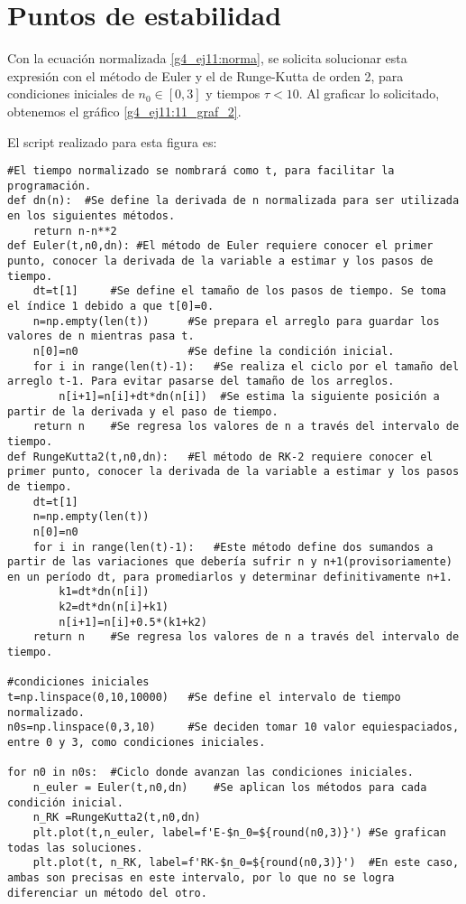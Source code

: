 \documentclass[../portafolio.tex]{subfiles}
\begin{document}
\section{Puntos de estabilidad}
Con la ecuación normalizada \eqref{g4_ej11:norma}, se solicita solucionar esta expresión con el método de Euler y el de Runge-Kutta de orden 2, para condiciones iniciales de $n_0 \in [0,3]$ y tiempos $\tau <10$. Al graficar lo solicitado, obtenemos el gráfico \ref{g4_ej11:11_graf_2}.

El script realizado para esta figura es:
\begin{verbatim}
#El tiempo normalizado se nombrará como t, para facilitar la programación.
def dn(n):  #Se define la derivada de n normalizada para ser utilizada en los siguientes métodos.
    return n-n**2
def Euler(t,n0,dn): #El método de Euler requiere conocer el primer punto, conocer la derivada de la variable a estimar y los pasos de tiempo.
    dt=t[1]     #Se define el tamaño de los pasos de tiempo. Se toma el índice 1 debido a que t[0]=0.
    n=np.empty(len(t))      #Se prepara el arreglo para guardar los valores de n mientras pasa t.
    n[0]=n0                 #Se define la condición inicial.
    for i in range(len(t)-1):   #Se realiza el ciclo por el tamaño del arreglo t-1. Para evitar pasarse del tamaño de los arreglos.      
        n[i+1]=n[i]+dt*dn(n[i])  #Se estima la siguiente posición a partir de la derivada y el paso de tiempo.
    return n    #Se regresa los valores de n a través del intervalo de tiempo.
def RungeKutta2(t,n0,dn):   #El método de RK-2 requiere conocer el primer punto, conocer la derivada de la variable a estimar y los pasos de tiempo.
    dt=t[1] 
    n=np.empty(len(t))
    n[0]=n0
    for i in range(len(t)-1):   #Este método define dos sumandos a partir de las variaciones que debería sufrir n y n+1(provisoriamente) en un período dt, para promediarlos y determinar definitivamente n+1.
        k1=dt*dn(n[i])
        k2=dt*dn(n[i]+k1)
        n[i+1]=n[i]+0.5*(k1+k2)
    return n    #Se regresa los valores de n a través del intervalo de tiempo.

#condiciones iniciales
t=np.linspace(0,10,10000)   #Se define el intervalo de tiempo normalizado.
n0s=np.linspace(0,3,10)     #Se deciden tomar 10 valor equiespaciados, entre 0 y 3, como condiciones iniciales.

for n0 in n0s:  #Ciclo donde avanzan las condiciones iniciales.
    n_euler = Euler(t,n0,dn)    #Se aplican los métodos para cada condición inicial.
    n_RK =RungeKutta2(t,n0,dn)
    plt.plot(t,n_euler, label=f'E-$n_0=${round(n0,3)}') #Se grafican todas las soluciones.
    plt.plot(t, n_RK, label=f'RK-$n_0=${round(n0,3)}')  #En este caso, ambas son precisas en este intervalo, por lo que no se logra diferenciar un método del otro.
\end{verbatim}
\end{document}
